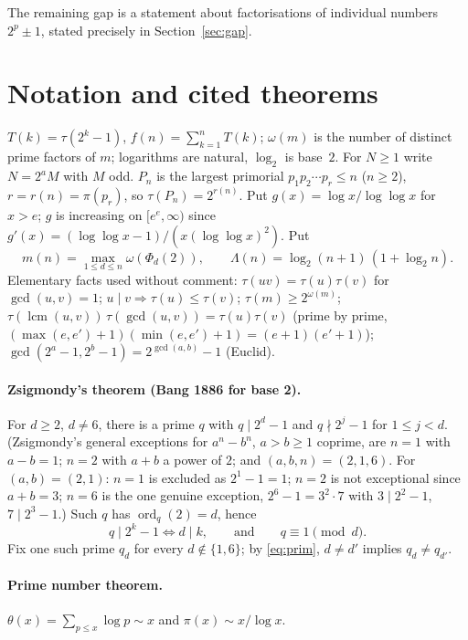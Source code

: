 \documentclass[11pt]{article}
\theoremstyle{remark}
\newcommand{\lcm}{\operatorname{lcm}}
\begin{document}
The remaining gap is a statement about factorisations of individual numbers $2^p\pm1$, stated
precisely in Section~\ref{sec:gap}.

\section{Notation and cited theorems}

$T(k)=\tau(2^k-1)$, $f(n)=\sum_{k=1}^nT(k)$; $\omega(m)$ is the number of distinct prime factors
of $m$; logarithms are natural, $\log_2$ is base~$2$. For $N\ge1$ write $N=2^aM$ with $M$ odd.
$P_n$ is the largest primorial $p_1p_2\cdots p_r\le n$ ($n\ge2$), $r=r(n)=\pi(p_r)$, so
$\tau(P_n)=2^{r(n)}$. Put $g(x)=\log x/\log\log x$ for $x>e$; $g$ is increasing on $[e^e,\infty)$
since $g'(x)=(\log\log x-1)/(x(\log\log x)^2)$. Put
\[
  m(n)=\max_{1\le d\le n}\omega(\Phi_d(2)),\qquad \Lambda(n)=\log_2(n+1)\,(1+\log_2 n).
\]
Elementary facts used without comment: $\tau(uv)=\tau(u)\tau(v)$ for $\gcd(u,v)=1$;
$u\mid v\Rightarrow\tau(u)\le\tau(v)$; $\tau(m)\ge 2^{\omega(m)}$;
$\tau(\lcm(u,v))\,\tau(\gcd(u,v))=\tau(u)\tau(v)$ (prime by prime,
$(\max(e,e')+1)(\min(e,e')+1)=(e+1)(e'+1)$); $\gcd(2^a-1,2^b-1)=2^{\gcd(a,b)}-1$ (Euclid).

\paragraph{Zsigmondy's theorem (Bang 1886 for base 2).} For $d\ge2$, $d\ne6$, there is a prime
$q$ with $q\mid 2^d-1$ and $q\nmid 2^j-1$ for $1\le j<d$. (Zsigmondy's general exceptions for
$a^n-b^n$, $a>b\ge1$ coprime, are $n=1$ with $a-b=1$; $n=2$ with $a+b$ a power of $2$; and
$(a,b,n)=(2,1,6)$. For $(a,b)=(2,1)$: $n=1$ is excluded as $2^1-1=1$; $n=2$ is not exceptional
since $a+b=3$; $n=6$ is the one genuine exception, $2^6-1=3^2\cdot7$ with $3\mid2^2-1$,
$7\mid2^3-1$.) Such $q$ has $\operatorname{ord}_q(2)=d$, hence
\begin{equation}\label{eq:prim}
  q\mid 2^k-1\iff d\mid k,\qquad\text{and}\qquad q\equiv1\pmod d .
\end{equation}
Fix one such prime $q_d$ for every $d\notin\{1,6\}$; by \eqref{eq:prim}, $d\ne d'$ implies
$q_d\ne q_{d'}$.

\paragraph{Prime number theorem.} $\theta(x)=\sum_{p\le x}\log p\sim x$ and
$\pi(x)\sim x/\log x$.
\end{document}
